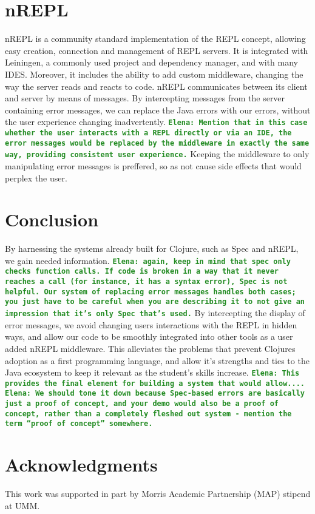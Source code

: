\documentclass[12pt]{article}
\newcommand{\comment}[1]{{\bf \tt  {#1}}}
\newcommand{\emcomment}[1]{\textcolor{ForestGreen}{\comment{Elena: {#1}}}}
\begin{document}
\section{nREPL}
nREPL is a community standard implementation of the REPL concept,
allowing easy creation, connection and management of REPL servers.
It is integrated with Leiningen, a commonly used project and dependency manager,
 and with many IDES. Moreover, it includes the ability to add custom middleware,
  changing the way the server reads and reacts to code.
 nREPL communicates between its client and server by means of messages.
 By intercepting messages from the server containing error messages,
 we can replace the Java errors with our errors,
  without the user experience changing inadvertently.
\emcomment{Mention that in this case whether the user interacts with a REPL directly or via an IDE,
the error messages would be replaced by the middleware in exactly the same way, providing consistent
user experience.}
  Keeping the middleware to only manipulating error messages
  is preffered, so as not cause side effects that would perplex the user.

\section{Conclusion}
By harnessing the systems already built for Clojure,
such as Spec and nREPL, we gain needed information.
\emcomment{again, keep in mind that spec only checks function calls. If code is broken
in a way that it never reaches a call (for instance, it has a syntax error), Spec is not helpful.
Our system of replacing error messages handles both cases; you just have to be careful
when you are describing it to not give an impression that it's only Spec that's used.}
By intercepting the display of error messages, we avoid changing users
interactions with the REPL in hidden ways, and allow our code to
be smoothly integrated into other tools as a user added nREPL middleware.
  This alleviates the problems that prevent Clojures
 adoption as a first programming language, and allow it's strengths
 and ties to the Java ecosystem to keep it relevant as the student's skills increase.
\emcomment{This provides the final element for building a system that would allow....}
\emcomment{We should tone it down because Spec-based errors are basically just a proof of concept,
and your demo would also be a proof of concept, rather than a completely fleshed out system - mention the term ``proof of concept'' somewhere.}





\section{Acknowledgments}
This work was supported in part by Morris Academic Partnership (MAP) stipend at UMM.




\end{document}
